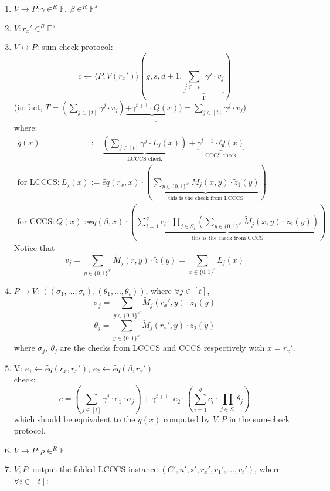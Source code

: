 \documentclass{article}
\theoremstyle{definition}
\begin{document}
\begin{enumerate}
	\item $V \rightarrow P: \gamma \in^R \mathbb{F},~ \beta \in^R \mathbb{F}^s$
	\item $V: r_x' \in^R \mathbb{F}^s$
	\item $V \leftrightarrow P$: sum-check protocol:
		$$c \leftarrow \langle P, V(r_x') \rangle (g, s, d+1, \underbrace{\sum_{j \in [t]} \gamma^j \cdot v_j}_\text{T})$$
		(in fact, $T=(\sum_{j \in [t]} \gamma^j \cdot v_j) \underbrace{+ \gamma^{t+1} \cdot Q(x)}_{=0}) = \sum_{j \in [t]} \gamma^j \cdot v_j$)\\
		where:
		\begin{align*}
			g(x) &:= \underbrace{\left( \sum_{j \in [t]} \gamma^j \cdot L_j(x) \right)}_\text{LCCCS check} + \underbrace{\gamma^{t+1} \cdot Q(x)}_\text{CCCS check}\\
			\text{for LCCCS:}~ L_j(x) &:= \widetilde{eq}(r_x, x) \cdot \left(
				\underbrace{\sum_{y \in \{0,1\}^{s'}} \widetilde{M}_j(x, y) \cdot \widetilde{z}_1(y)}_\text{this is the check from LCCCS}
			\right)\\
				\text{for CCCS:}~ Q(x) := &\widetilde{eq}(\beta, x) \cdot \left(
				\underbrace{ \sum_{i=1}^q c_i \cdot \prod_{j \in S_i} \left( \sum_{y \in \{0, 1\}^{s'}} \widetilde{M}_j(x, y) \cdot \widetilde{z}_2(y) \right) }_\text{this is the check from CCCS}
			\right)
		\end{align*}
		Notice that
		$$v_j= \sum_{y\in \{0,1\}^{s'}} \widetilde{M}_j(r, y) \cdot \widetilde{z}(y) = \sum_{x\in \{0,1\}^s} L_j(x)$$
	\item $P \rightarrow V$: $\left( (\sigma_1, \ldots, \sigma_t), (\theta_1, \ldots, \theta_t) \right)$, where $\forall j \in [t]$,
		$$\sigma_j = \sum_{y \in \{0,1\}^{s'}} \widetilde{M}_j(r_x', y) \cdot \widetilde{z}_1(y)$$
		$$\theta_j = \sum_{y \in \{0, 1\}^{s'}} \widetilde{M}_j(r_x', y) \cdot \widetilde{z}_2(y)$$
		where $\sigma_j,~\theta_j$ are the checks from LCCCS and CCCS respectively with $x=r_x'$.
	\item V: $e_1 \leftarrow \widetilde{eq}(r_x, r_x')$, $e_2 \leftarrow \widetilde{eq}(\beta, r_x')$\\
		check:
		$$c = \left(\sum_{j \in [t]} \gamma^j \cdot e_1 \cdot \sigma_j \right) + \gamma^{t+1} \cdot e_2 \cdot \left( \sum_{i=1}^q c_i \cdot \prod_{j \in S_i} \theta_j \right)$$
		which should be equivalent to the $g(x)$ computed by $V,P$ in the sum-check protocol.
	\item $V \rightarrow P: \rho \in^R \mathbb{F}$
	\item $V, P$: output the folded LCCCS instance $(C', u', \mathsf{x}', r_x', v_1', \ldots, v_t')$, where $\forall i \in [t]$:

\end{enumerate}
\end{document}

